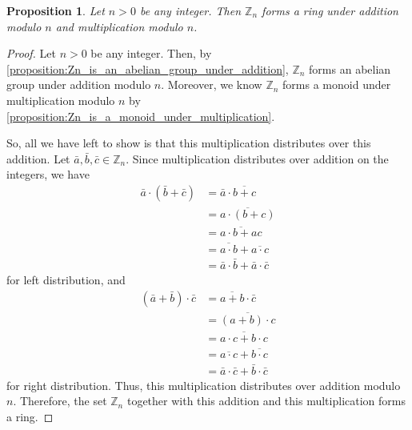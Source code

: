 \documentclass[10pt, titlepage]{amsart}
\newcommand\Z{{\mathbb Z}}
\newtheorem{prop}{Proposition}[subsection]
\theoremstyle{definition}
\begin{document}
	\begin{prop}\label{proposition:Zn_is_a_ring}
		Let $n > 0$ be any integer. Then $\Z_n$ forms a ring under addition modulo $n$ and multiplication modulo $n$.
	\end{prop}
	
	\begin{proof}
		Let $n > 0$ be any integer.
		Then, by \cref{proposition:Zn_is_an_abelian_group_under_addition}, $\Z_n$ forms an abelian group under addition modulo $n$.
		Moreover, we know $\Z_n$ forms a monoid under multiplication modulo $n$ by \cref{proposition:Zn_is_a_monoid_under_multiplication}. %
		
		So, all we have left to show is that this multiplication distributes over this addition.
		Let $\bar{a}, \bar{b}, \bar{c} \in \Z_n$.
		Since multiplication distributes over addition on the integers, we have	
		\begin{align*}
			\bar{a} \cdot (\bar{b}+\bar{c}) 
			&= \bar{a} \cdot \overline{b+c} \\
			&= \overline{a \cdot (b+c)} \\
			&= \overline{a \cdot b+ac} \\
			&= \overline{a \cdot b} + \overline{a \cdot c} \\
			&= \bar{a} \cdot \bar{b} + \bar{a} \cdot \bar{c}
		\end{align*}
		for left distribution, and 
		\begin{align*}
			(\bar{a}+\bar{b}) \cdot \bar{c} 
			&= \overline{a + b} \cdot \bar{c} \\
			&= \overline{(a + b) \cdot c} \\
			&= \overline{a \cdot c + b \cdot c} \\
			&= \overline{a \cdot c} + \overline{b \cdot c} \\
			&= \bar{a} \cdot \bar{c} + \bar{b} \cdot \bar{c}
		\end{align*}
		for right distribution.
		Thus, this multiplication distributes over addition modulo $n$.
		Therefore, the set $\Z_n$ together with this addition and this multiplication forms a ring.	
	\end{proof}
	
\end{document}
